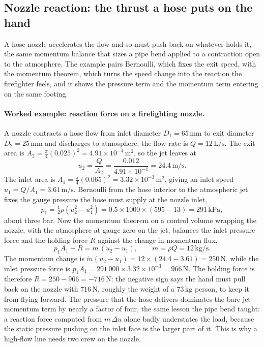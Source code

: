\subsection{Nozzle reaction: the thrust a hose puts on the hand}

A hose nozzle accelerates the flow and so must push back on whatever
holds it, the same momentum balance that sizes a pipe bend applied to a
contraction open to the atmosphere. The example pairs Bernoulli, which
fixes the exit speed, with the momentum theorem, which turns the speed
change into the reaction the firefighter feels, and it shows the
pressure term and the momentum term entering on the same footing.

\paragraph{Worked example: reaction force on a firefighting nozzle.} A
nozzle contracts a hose flow from inlet diameter $D_1 =
65\,\si{\milli\meter}$ to exit diameter $D_2 = 25\,\si{\milli\meter}$
and discharges to atmosphere; the flow rate is $Q =
12\,\text{L/s}$. The exit area is $A_2 = \tfrac{\pi}{4}(0.025)^2 =
4.91\times 10^{-4}\,\si{\meter}^2$, so the jet leaves at
\[
u_2 = \frac{Q}{A_2} = \frac{0.012}{4.91\times 10^{-4}}
= 24.4\,\si{\meter\per\second}.
\]
The inlet area is $A_1 = \tfrac{\pi}{4}(0.065)^2 = 3.32\times
10^{-3}\,\si{\meter}^2$, giving an inlet speed $u_1 = Q/A_1 =
3.61\,\si{\meter\per\second}$. Bernoulli from the hose interior to the
atmospheric jet fixes the gauge pressure the hose must supply at the
nozzle inlet,
\[
p_1 = \tfrac12\rho(u_2^2 - u_1^2)
= 0.5\times 1000\times(595 - 13)
= 291\,\text{kPa},
\]
about three bar. Now the momentum theorem on a control volume wrapping
the nozzle, with the atmosphere at gauge zero on the jet, balances the
inlet pressure force and the holding force $R$ against the change in
momentum flux,
\[
p_1 A_1 + R = \dot m\,(u_2 - u_1),
\qquad
\dot m = \rho Q = 12\,\si{\kilogram\per\second}.
\]
The momentum change is $\dot m(u_2 - u_1) = 12\times(24.4 - 3.61) =
250\,\si{\newton}$, while the inlet pressure force is $p_1 A_1 =
291\,000\times 3.32\times 10^{-3} = 966\,\si{\newton}$. The holding
force is therefore $R = 250 - 966 = -716\,\si{\newton}$: the negative
sign says the hand must pull back on the nozzle with $716\,\si{\newton}$,
roughly the weight of a $73\,\si{\kilogram}$ person, to keep it from
flying forward. The pressure that the hose delivers dominates the bare
jet-momentum term by nearly a factor of four, the same lesson the pipe
bend taught: a reaction force computed from $\dot m\,\Delta u$ alone
badly understates the load, because the static pressure pushing on the
inlet face is the larger part of it. This is why a high-flow line needs
two crew on the nozzle.


